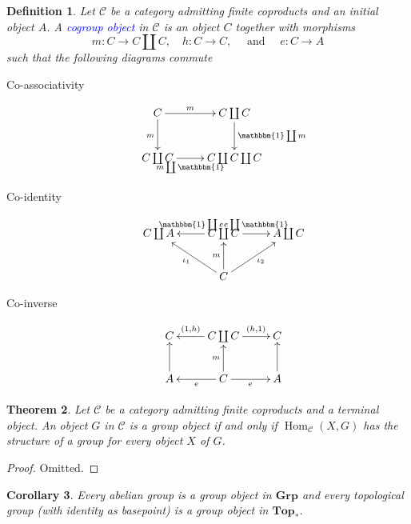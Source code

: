 \documentclass[11pt]{article}
\theoremstyle{thmstyle}
\newtheorem{theorem}{Theorem}
\theoremstyle{defstyle}
\newtheorem{definition}[theorem]{Definition}
\newtheorem{corollary}[theorem]{Corollary}
\newcommand{\catGrp}{\mathbf{Grp}}
\newcommand{\catTop}{\mathbf{Top}}
\newcommand{\Hom}{\operatorname{Hom}}
\newcommand{\define}[1]{\textcolor{blue}{\textit{#1}}}
\newcommand{\scrC}{\mathscr{C}}
\newcommand{\bbone}{\mathbbm{1}}
\begin{document}
\begin{definition}
	Let $\scrC$ be a category admitting finite coproducts and an initial object $A$. A \define{cogroup object} in $\scrC$ is an object $C$ together with morphisms 
	\begin{equation*}
		m\colon C\to C\coprod C,\quad h\colon C\to C,\quad\text{ and }\quad e\colon C\to A
	\end{equation*}
	such that the following diagrams commute 
	\begin{description}
		\item[Co-associativity]  
		\begin{equation*}
			\xymatrix {
				C\ar[r]^-m\ar[d]_m & C\coprod C\ar[d]^-{\bbone\coprod m}\\
				C\coprod C\ar[r]_-{m\coprod\bbone} & C\coprod C\coprod C
			}
		\end{equation*}
		\item[Co-identity] 
		\begin{equation*}
			\xymatrix {
				C\coprod A & C\coprod C\ar[l]_{\bbone\coprod e}\ar[r]^{e\coprod\bbone} & A\coprod C\\
				& C\ar[u]^m\ar[lu]^{\iota_1}\ar[ru]_{\iota_2} & 
			}
		\end{equation*}
		\item[Co-inverse]
		\begin{equation*}
			\xymatrix {
				C & C\coprod C\ar[r]^-{(h, 1)}\ar[l]_-{(1, h)} & C\\
				A\ar[u] & C\ar[r]_e\ar[l]^e\ar[u]^m & A\ar[u]
			}
		\end{equation*}
	\end{description}
\end{definition}

\begin{theorem}
	Let $\scrC$ be a category admitting finite coproducts and a terminal object. An object $G$ in $\scrC$ is a group object if and only if $\Hom_\scrC(X, G)$ has the structure of a group for every object $X$ of $G$.
\end{theorem}
\begin{proof}
	Omitted.
\end{proof}

\begin{corollary}
	Every abelian group is a group object in $\catGrp$ and every topological group (with identity as basepoint) is a group object in $\catTop_\ast$.
\end{corollary}
\end{document}
